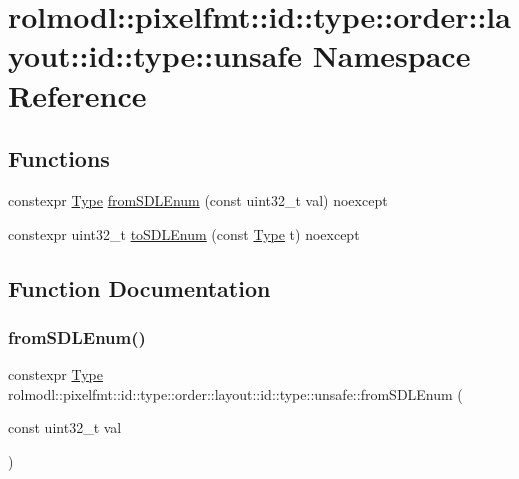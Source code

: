 \hypertarget{namespacerolmodl_1_1pixelfmt_1_1id_1_1type_1_1order_1_1layout_1_1id_1_1type_1_1unsafe}{}\section{rolmodl\+::pixelfmt\+::id\+::type\+::order\+::layout\+::id\+::type\+::unsafe Namespace Reference}
\label{namespacerolmodl_1_1pixelfmt_1_1id_1_1type_1_1order_1_1layout_1_1id_1_1type_1_1unsafe}
\subsection*{Functions}
\begin{DoxyCompactItemize}
\item 
constexpr \mbox{\hyperlink{namespacerolmodl_1_1pixelfmt_1_1id_acacda2442a2997fe425e2faa4e5d002b}{Type}} \mbox{\hyperlink{namespacerolmodl_1_1pixelfmt_1_1id_1_1type_1_1order_1_1layout_1_1id_1_1type_1_1unsafe_aa5d440563dadb62d01d35453db173473}{from\+S\+D\+L\+Enum}} (const uint32\+\_\+t val) noexcept
\item 
constexpr uint32\+\_\+t \mbox{\hyperlink{namespacerolmodl_1_1pixelfmt_1_1id_1_1type_1_1order_1_1layout_1_1id_1_1type_1_1unsafe_adfeb45eb216120c547a1ac7778fa40f9}{to\+S\+D\+L\+Enum}} (const \mbox{\hyperlink{namespacerolmodl_1_1pixelfmt_1_1id_acacda2442a2997fe425e2faa4e5d002b}{Type}} t) noexcept
\end{DoxyCompactItemize}


\subsection{Function Documentation}
\mbox{\label{namespacerolmodl_1_1pixelfmt_1_1id_1_1type_1_1order_1_1layout_1_1id_1_1type_1_1unsafe_aa5d440563dadb62d01d35453db173473}} 
\subsubsection{\texorpdfstring{fromSDLEnum()}{fromSDLEnum()}}
{\footnotesize\ttfamily constexpr \mbox{\hyperlink{namespacerolmodl_1_1pixelfmt_1_1id_acacda2442a2997fe425e2faa4e5d002b}{Type}} rolmodl\+::pixelfmt\+::id\+::type\+::order\+::layout\+::id\+::type\+::unsafe\+::from\+S\+D\+L\+Enum (\begin{DoxyParamCaption}\item[{const uint32\+\_\+t}]{val }\end{DoxyParamCaption})\hspace{0.3cm}{\ttfamily [noexcept]}}



